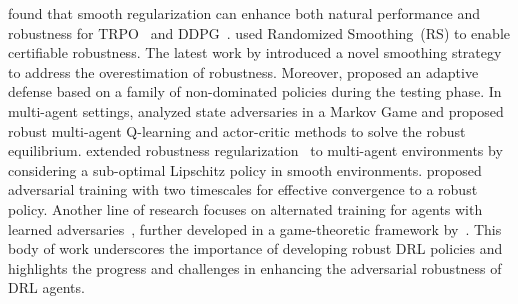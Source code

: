 \cite{shen2020deep} found that smooth regularization can enhance both natural performance and robustness for TRPO~\citep{schulman2015trust} and DDPG~\citep{silver2014deterministic}.
\cite{wu2021crop, kumar2021policy} used Randomized Smoothing~(RS) to enable certifiable robustness.
The latest work by \cite{sun2024breaking} introduced a novel smoothing strategy to address the overestimation of robustness.
Moreover, \cite{liu2024beyond} proposed an adaptive defense based on a family of non-dominated policies during the testing phase. 
In multi-agent settings, \cite{he2023robust} analyzed state adversaries in a Markov Game and proposed robust multi-agent Q-learning and actor-critic methods to solve the robust equilibrium.
\cite{bukharin2024robust} extended robustness regularization~\citep{shen2020deep, zhang2020robust} to multi-agent environments by considering a sub-optimal Lipschitz policy in smooth environments. 
\cite{liu2023rethinking} proposed adversarial training with two timescales for effective convergence to a robust policy.
Another line of research focuses on alternated training for agents with learned adversaries~\citep{zhang2021robust, sun2021strongest}, further developed in a game-theoretic framework by~\citep{liang2023game}.
This body of work underscores the importance of developing robust DRL policies and highlights the progress and challenges in enhancing the adversarial robustness of DRL agents.